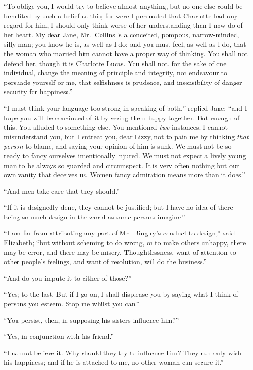 \documentclass[12pt,english,oneside]{book}
\begin{document}
{}``To oblige you, I would try to believe almost anything, but no
one else could be benefited by such a belief as this; for were I persuaded
that Charlotte had any regard for him, I should only think worse of
her understanding than I now do of her heart. My dear Jane, Mr.\ Collins
is a conceited, pompous, narrow-minded, silly man; you know he is,
as well as I do; and you must feel, as well as I do, that the woman
who married him cannot have a proper way of thinking. You shall not
defend her, though it is Charlotte Lucas. You shall not, for the sake
of one individual, change the meaning of principle and integrity,
nor endeavour to persuade yourself or me, that selfishness is prudence,
and insensibility of danger security for happiness.''

{}``I must think your language too strong in speaking of both,''
replied Jane; {}``and I hope you will be convinced of it by seeing
them happy together. But enough of this. You alluded to something
else. You mentioned \textit{two} instances. I cannot misunderstand
you, but I entreat you, dear Lizzy, not to pain me by thinking \textit{that}
\textit{person} to blame, and saying your opinion of him is sunk.
We must not be so ready to fancy ourselves intentionally injured.
We must not expect a lively young man to be always so guarded and
circumspect. It is very often nothing but our own vanity that deceives
us. Women fancy admiration means more than it does.''

{}``And men take care that they should.''

{}``If it is designedly done, they cannot be justified; but I have
no idea of there being so much design in the world as some persons
imagine.''

{}``I am far from attributing any part of Mr.\ Bingley's conduct
to design,'' said Elizabeth; {}``but without scheming to do wrong,
or to make others unhappy, there may be error, and there may be misery.
Thoughtlessness, want of attention to other people's feelings, and
want of resolution, will do the business.''

{}``And do you impute it to either of those?''\ 

{}``Yes; to the last. But if I go on, I shall displease you by saying
what I think of persons you esteem. Stop me whilst you can.''

{}``You persist, then, in supposing his sisters influence him?''\ 

{}``Yes, in conjunction with his friend.''

{}``I cannot believe it. Why should they try to influence him? They
can only wish his happiness; and if he is attached to me, no other
woman can secure it.''
\end{document}
